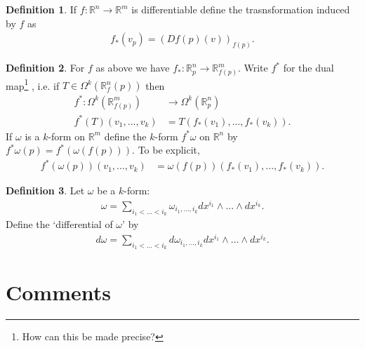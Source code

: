 \documentclass[20pt]{article}
\theoremstyle{plain}
\theoremstyle{definition}
\newtheorem{definition}{Definition}
\newcommand{\reals}{\mathbb{R}}
\begin{document}
  \begin{definition}
    If $f: \reals^n \to \reals^m$ is differentiable define the trasnsformation induced by $f$ as
    \begin{align*}
      f_*(v_p) = (Df(p)(v))_{f(p)}.
    \end{align*}
  \end{definition}

  \begin{definition}
    For $f$ as above we have $f_* : \reals^n_p \to \reals^m_{f(p)}$. 
    Write $f^*$ for the dual map\footnote{How can this be made precise?}
    , i.e. if $T \in \Omega^k(\reals^n_f(p))$ then
    \begin{align*}
      f^* : \Omega^k(\reals^m_{f(p)}) &\to \Omega^k(\reals^n_p)\\
      f^*(T)(v_1, ..., v_k) &= T(f_*(v_1), ..., f_*(v_k)).
    \end{align*}
    If $\omega$ is a $k$-form on $\reals^m$ define the $k$-form $f^*\omega$ on $\reals^n$ by $f^*\omega(p) = f^*(\omega(f(p))).$
    To be explicit, 
    \begin{align*}
     f^*(\omega(p))(v_1, ..., v_k) &= \omega(f(p))(f_*(v_1), ..., f_*(v_k)).      
    \end{align*} 
  \end{definition}



  \begin{definition}
    Let $\omega$ be a $k$-form:
    \begin{align*}
      \omega = \sum_{i_1 < ... < i_k} \omega_{i_1,...,i_k}dx^{i_1} \wedge ... \wedge dx^{i_k}.
    \end{align*}
    Define the `differential of $\omega$' by 
    \begin{align*}
      d\omega = \sum_{i_1 < ... < i_k} d\omega_{i_1,...,i_k}dx^{i_1} \wedge ... \wedge dx^{i_k}.
    \end{align*}
  \end{definition}



\section{Comments}
\end{document}

